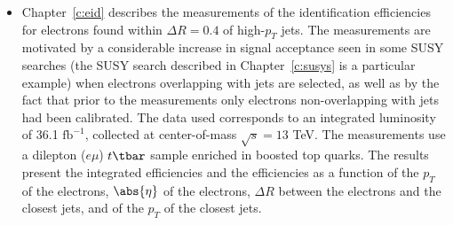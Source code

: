 \begin{itemize}[label=]
\item Chapter~\ref{c:eid} describes the measurements of the identification
efficiencies for electrons found within $\Delta R = 0.4$ of high-$p_T$ jets.
The measurements are motivated by a considerable increase in signal acceptance
seen in some SUSY searches (the SUSY search described in Chapter~\ref{c:susys}
is a particular example) when electrons overlapping with jets are selected, as
well as by the fact that prior to the measurements only electrons
non-overlapping with jets had been calibrated. The data used corresponds to an
integrated luminosity of 36.1 $\text{fb}^{-1}$, collected at center-of-mass
$\sqrt{s} = 13$ TeV. The measurements use a dilepton ($e\mu$) $t\tbar$ sample
enriched in boosted top quarks. The results present the integrated efficiencies
and the efficiencies as a function of the $p_T$ of the electrons, $\abs{\eta}$
of the electrons, $\Delta R$ between the electrons and the closest jets, and of
the $p_T$ of the closest jets.

\end{itemize}

